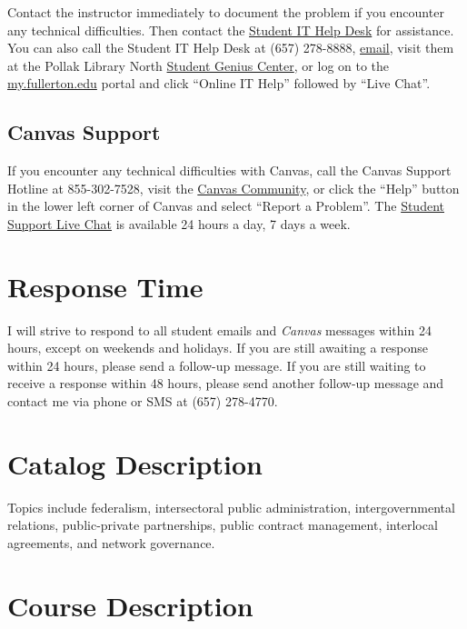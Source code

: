 \documentclass[12pt, letterpaper]{article}
\begin{document}
Contact the instructor immediately to document the problem if you encounter any technical difficulties. Then contact the \href{http://www.fullerton.edu/it/students/helpdesk/index.php}{Student IT Help Desk} for assistance. You can also call the Student IT Help Desk at (657) 278-8888, \href{mailto:StudentITHelpDesk@fullerton.edu}{email}, visit them at the Pollak Library North \href{http://www.fullerton.edu/it/students/sgc/index.php}{Student Genius Center}, or log on to the \href{http://my.fullerton.edu/}{my.fullerton.edu} portal and click ``Online IT Help'' followed by ``Live Chat''.

\subsection*{Canvas Support}

If you encounter any technical difficulties with Canvas, call the Canvas Support Hotline at 855-302-7528, visit the \href{https://community.canvaslms.com/docs/DOC-10720-67952720329}{Canvas Community}, or click the ``Help'' button in the lower left corner of Canvas and select ``Report a Problem''. The \href{https://cases.canvaslms.com/liveagentchat?chattype=student&sfid=001A000000YzcwQIAR}{Student Support Live Chat} is available 24 hours a day, 7 days a week.

\section{Response Time} I will strive to respond to all student emails and \emph{Canvas} messages within 24 hours, except on weekends and holidays. If you are still awaiting a response within 24 hours, please send a follow-up message. If you are still waiting to receive a response within 48 hours, please send another follow-up message and contact me via phone or SMS at (657) 278-4770.

\section{Catalog Description}

Topics include federalism, intersectoral public administration, intergovernmental relations, public-private partnerships, public contract management, interlocal agreements, and network governance.

\section{Course Description}
\end{document}
